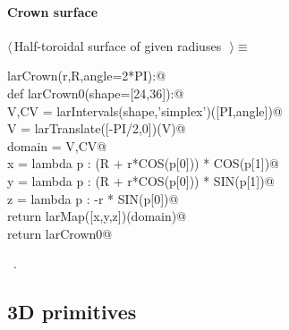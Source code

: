 \documentclass[11pt,oneside]{article}	%
\begin{document}
\paragraph{Crown surface}
\begin{flushleft} \small \label{scrap14}
$\langle\,$Half-toroidal surface of given radiuses\nobreak\ {\footnotesize {}}$\,\rangle\equiv$
\vspace{-1ex}
\begin{list}{}{} \item
\mbox{}\verb@def larCrown(r,R,angle=2*PI):@\\
\mbox{}\verb@   def larCrown0(shape=[24,36]):@\\
\mbox{}\verb@      V,CV = larIntervals(shape,'simplex')([PI,angle])@\\
\mbox{}\verb@      V = larTranslate([-PI/2,0])(V)@\\
\mbox{}\verb@      domain = V,CV@\\
\mbox{}\verb@      x = lambda p : (R + r*COS(p[0])) * COS(p[1])@\\
\mbox{}\verb@      y = lambda p : (R + r*COS(p[0])) * SIN(p[1])@\\
\mbox{}\verb@      z = lambda p : -r * SIN(p[0])@\\
\mbox{}\verb@      return larMap([x,y,z])(domain)@\\
\mbox{}\verb@   return larCrown0@\\
\mbox{}\verb@@{\NWsep}
\end{list}
\vspace{-1ex}
\footnotesize\addtolength{\baselineskip}{-1ex}
\begin{list}{}{\setlength{\itemsep}{-\parsep}\setlength{\itemindent}{-\leftmargin}}
\item \NWtxtMacroRefIn\ .
\end{list}
\end{flushleft}

\subsection{3D primitives}
\end{document}
